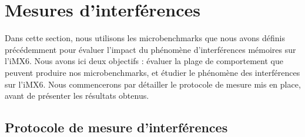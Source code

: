 

\section{Mesures d'interférences}
\label{section:eval-microbenchmarks}

Dans cette section, nous utilisons les microbenchmarks que nous avons définis précédemment pour évaluer l'impact du phénomène d'interférences mémoires sur l'iMX6.
Nous avons ici deux objectifs : évaluer la plage de comportement que peuvent produire nos microbenchmarks, et étudier le phénomène des interférences sur l'iMX6.
Nous commencerons par détailler le protocole de mesure mis en place, avant de présenter les résultats obtenus.

\subsection{Protocole de mesure d'interférences}
\label{section:protocole}


